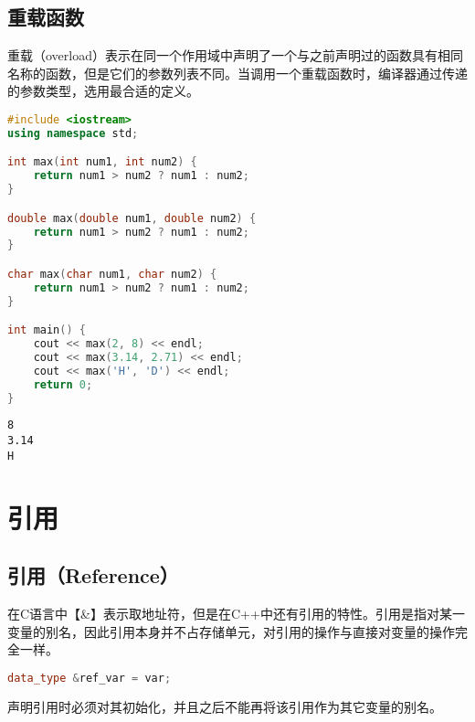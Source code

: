 \subsection{重载函数}

重载（overload）表示在同一个作用域中声明了一个与之前声明过的函数具有相同名称的函数，但是它们的参数列表不同。当调用一个重载函数时，编译器通过传递的参数类型，选用最合适的定义。 \\


\begin{lstlisting}[language=C++]
#include <iostream>
using namespace std;

int max(int num1, int num2) {
    return num1 > num2 ? num1 : num2;
}

double max(double num1, double num2) {
    return num1 > num2 ? num1 : num2;
}

char max(char num1, char num2) {
    return num1 > num2 ? num1 : num2;
}

int main() {
    cout << max(2, 8) << endl;
    cout << max(3.14, 2.71) << endl;
    cout << max('H', 'D') << endl;
    return 0;
}
\end{lstlisting}

\begin{tcolorbox}
	\begin{verbatim}
8
3.14
H
	\end{verbatim}
\end{tcolorbox}

\newpage

\section{引用}

\subsection{引用（Reference）}

在C语言中【\&】表示取地址符，但是在C++中还有引用的特性。引用是指对某一变量的别名，因此引用本身并不占存储单元，对引用的操作与直接对变量的操作完全一样。

\vspace{-0.5cm}

\begin{lstlisting}[language=C++]
data_type &ref_var = var;
\end{lstlisting}

声明引用时必须对其初始化，并且之后不能再将该引用作为其它变量的别名。 \\

